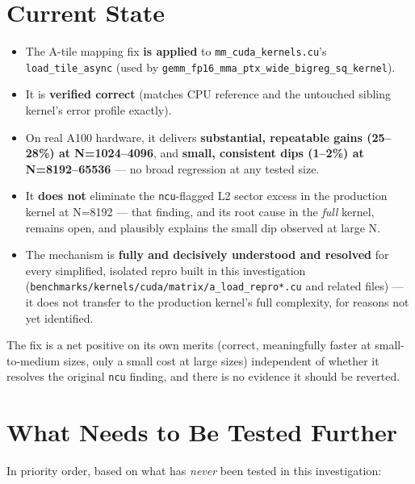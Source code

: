 \documentclass[11pt]{article}
\begin{document}
\section{Current State}

\begin{itemize}
\item The A-tile mapping fix \textbf{is applied} to \texttt{mm\_cuda\_kernels.cu}'s \texttt{load\_tile\_async} (used by \texttt{gemm\_fp16\_mma\_ptx\_wide\_bigreg\_sq\_kernel}).
\item It is \textbf{verified correct} (matches CPU reference and the untouched sibling kernel's error profile exactly).
\item On real A100 hardware, it delivers \textbf{substantial, repeatable gains (25--28\%) at N=1024--4096}, and \textbf{small, consistent dips (1--2\%) at N=8192--65536} --- no broad regression at any tested size.
\item It \textbf{does not} eliminate the \texttt{ncu}-flagged L2 sector excess in the production kernel at N=8192 --- that finding, and its root cause in the \emph{full} kernel, remains open, and plausibly explains the small dip observed at large N.
\item The mechanism is \textbf{fully and decisively understood and resolved} for every simplified, isolated repro built in this investigation (\texttt{benchmarks/kernels/cuda/matrix/a\_load\_repro*.cu} and related files) --- it does not transfer to the production kernel's full complexity, for reasons not yet identified.
\end{itemize}

The fix is a net positive on its own merits (correct, meaningfully faster at small-to-medium sizes, only a small cost at large sizes) independent of whether it resolves the original \texttt{ncu} finding, and there is no evidence it should be reverted.

\section{What Needs to Be Tested Further}

In priority order, based on what has \emph{never} been tested in this investigation:
\end{document}
